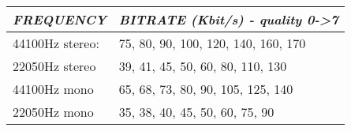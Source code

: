 \begin{center}\begin{tabular}{|p{4.598cm}|p{8.051001cm}|}
\hline
{\centering\bfseries\itshape
FREQUENCY
\par}
&
{\centering\bfseries\itshape
BITRATE  (Kbit/s) {}- quality 0{}-{\textgreater}7
\par}
\\\hline
{\centering
44100Hz stereo:
\par}
&
75, 80, 90, 100, 120, 140, 160, 170
\\\hline
{\centering
22050Hz stereo
\par}
&
39, 41, 45, 50, 60, 80, 110, 130
\\\hline
{\centering
44100Hz mono
\par}
&
65, 68, 73, 80, 90, 105, 125, 140
\\\hline
{\centering
22050Hz mono
\par}
&
35, 38, 40, 45, 50, 60, 75, 90
\\\hline
\end{tabular}\end{center}

